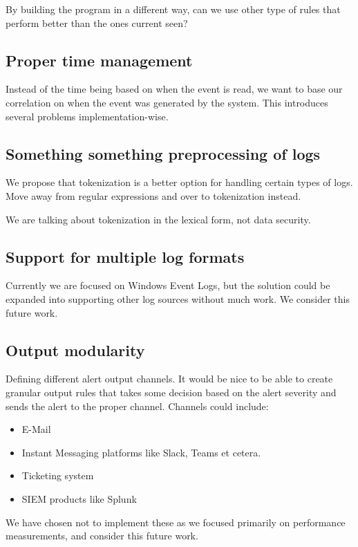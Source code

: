 By building the program in a different way, can we use other type of rules that perform better than the ones current seen?

\subsection{Proper time management}
\label{sub:time-management}

Instead of the time being based on when the event is read, we want to base our correlation on when the event was generated by the system. This introduces several problems implementation-wise.

\subsection{Something something preprocessing of logs}

We propose that tokenization is a better option for handling certain types of logs. Move away from regular expressions and over to tokenization instead.

We are talking about tokenization in the lexical form, not data security.

\subsection{Support for multiple log formats}
\label{sub:multiple-log-formats}

Currently we are focused on Windows Event Logs, but the solution could be expanded into supporting other log sources without much work. We consider this future work.

\subsection{Output modularity}
\label{sub:modularity}

Defining different alert output channels. It would be nice to be able to create granular output rules that takes some decision based on the alert severity and sends the alert to the proper channel. Channels could include:

\begin{itemize}
    \item E-Mail
    \item Instant Messaging platforms like Slack, Teams et cetera.
    \item Ticketing system
    \item SIEM products like Splunk
\end{itemize}
We have chosen not to implement these as we focused primarily on performance measurements, and consider this future work.


